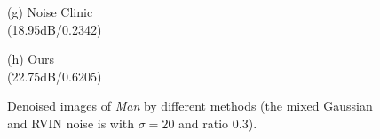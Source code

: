 \documentclass[runningheads]{llncs}
\begin{document}
\begin{figure}
{\begin{minipage}[t]{0.244\textwidth}
{\footnotesize (g) Noise Clinic \\(18.95dB/0.2342)}
\end{minipage}
\begin{minipage}[t]{0.244\textwidth}
\centering
{}
{\footnotesize (h) Ours \\(22.75dB/0.6205)}
\end{minipage}
}
\caption{Denoised images of \textsl{Man} by different methods (the mixed Gaussian and RVIN noise is with $\sigma = 20$ and ratio $0.3$).}
\label{fig16}
\end{figure}
\end{document}

